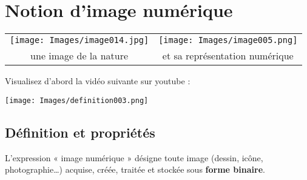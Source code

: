 \documentclass[10pt,fleqn]{article} %
\begin{document}
\section{Notion d'image numérique}

\begin{tabular}{cc}
	\texttt{[image: Images/image014.jpg]} 
	
	&
	
	\texttt{[image: Images/image005.png]} \\
	
	une image de la nature   &  et sa représentation numérique
	
\end{tabular}


\vspace{1cm}


Visualisez d'abord  la vidéo suivante sur youtube :\\


\begin{center}
	\texttt{[image: Images/definition003.png]}
\end{center}

\subsection{Définition et propriétés}
L'expression « image numérique » désigne toute image (dessin, icône, photographie…) acquise, créée, traitée et stockée sous \textbf{forme binaire}. \\
\end{document}
